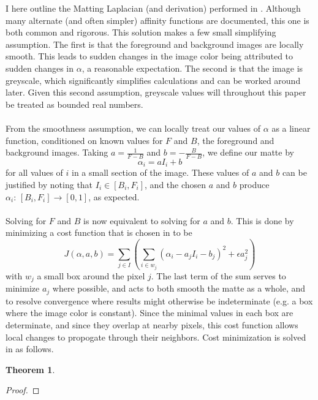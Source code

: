 I here outline the Matting Laplacian (and derivation) performed in \cite{levin08}. Although many alternate (and often simpler) affinity functions are documented, this one is both common and rigorous. This solution makes a few small simplifying assumption. The first is that the foreground and background images are locally smooth. This leads to sudden changes in the image color being attributed to sudden changes in $\alpha$, a reasonable expectation. The second is that the image is greyscale, which significantly simplifies calculations and can be worked around later. Given this second assumption, greyscale values will throughout this paper be treated as bounded real numbers.
\\\\
From the smoothness assumption, we can locally treat our values of $\alpha$ as a linear function, conditioned on known values for $F$ and $B$, the foreground and background images. Taking $a=\frac{1}{F-B}$ and $b=-\frac{B}{F-B}$, we define our matte by
\[\alpha_i=aI_i+b\]
for all values of $i$ in a small section of the image. These values of $a$ and $b$ can be justified by noting that $I_i\in[B_i,F_i]$, and the chosen $a$ and $b$ produce $\alpha_i:\,[B_i,F_i]\to[0,1]$, as expected.
\\\\
Solving for $F$ and $B$ is now equivalent to solving for $a$ and $b$. This is done by minimizing a cost function that is chosen in \cite{levin08} to be
\[J(\alpha,a,b)=
	\sum_{j\in I}\left(\sum_{i\in w_j}\left(
		\alpha_i-a_jI_i-b_j\right)^2+\epsilon
		a_j^2\right)\]
with $w_j$ a small box around the pixel $j$. The last term of the sum serves to minimize $a_j$ where possible, and acts to both smooth the matte as a whole, and to resolve convergence where results might otherwise be indeterminate (e.g. a box where the image color is constant). Since the minimal values in each box are determinate, and since they overlap at nearby pixels, this cost function allows local changes to propogate through their neighbors. Cost minimization is solved in \cite{levin08} as follows.

\newtheorem{matlapthm}{Theorem}
\begin{matlapthm}
\end{matlapthm}
\begin{proof}
\end{proof}
